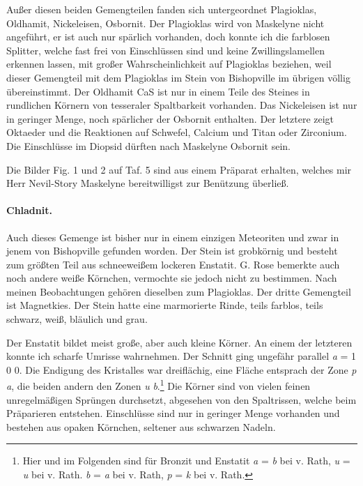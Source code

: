 \documentclass[a4paper, 12pt, oneside]{article}
\begin{document}
Außer diesen beiden Gemengteilen fanden sich untergeordnet Plagioklas, Oldhamit, Nickeleisen, Osbornit. Der Plagioklas wird von Maskelyne nicht angeführt, er ist auch nur spärlich vorhanden, doch konnte ich die farblosen Splitter, welche fast frei von Einschlüssen sind und keine Zwillingslamellen erkennen lassen, mit großer Wahrscheinlichkeit auf Plagioklas beziehen, weil dieser Gemengteil mit dem Plagioklas im Stein von Bishopville im übrigen völlig übereinstimmt. Der Oldhamit CaS ist nur in einem Teile des Steines in rundlichen Körnern von tesseraler Spaltbarkeit vorhanden. Das Nickeleisen ist nur in geringer Menge, noch spärlicher der Osbornit enthalten. Der letztere zeigt Oktaeder und die Reaktionen auf Schwefel, Calcium und Titan oder Zirconium. Die Einschlüsse im Diopsid dürften nach Maskelyne Osbornit sein.

Die Bilder Fig. 1 und 2 auf Taf. 5 sind aus einem Präparat erhalten, welches mir Herr Nevil-Story Maskelyne bereitwilligst zur Benützung überließ.

\paragraph{Chladnit.} Auch dieses Gemenge ist bisher nur in einem einzigen Meteoriten und zwar in jenem von Bishopville gefunden worden. Der Stein ist grobkörnig und besteht zum größten Teil aus schneeweißem lockeren Enstatit. G. Rose bemerkte auch noch andere weiße Körnchen, vermochte sie jedoch nicht zu bestimmen. Nach meinen Beobachtungen gehören dieselben zum Plagioklas. Der dritte Gemengteil ist Magnetkies. Der Stein hatte eine marmorierte Rinde, teils farblos, teils schwarz, weiß, bläulich und grau.

Der Enstatit bildet meist große, aber auch kleine Körner. An einem der letzteren konnte ich scharfe Umrisse wahrnehmen. Der Schnitt ging ungefähr parallel \emph{a} = 1 0 0. Die Endigung des Kristalles war dreiflächig, eine Fläche entsprach der Zone \emph{p} \emph{a},  die beiden andern den Zonen \emph{u} \emph{b}.\footnote{Hier und im Folgenden sind für Bronzit und Enstatit \emph{a} = \emph{b} bei v. Rath, \emph{u} = \emph{u} bei v. Rath. \emph{b} = \emph{a} bei v. Rath, \emph{p} = \emph{k} bei v. Rath.} Die Körner sind von vielen feinen unregelmäßigen Sprüngen durchsetzt, abgesehen von den Spaltrissen, welche beim Präparieren entstehen. Einschlüsse sind nur in geringer Menge vorhanden und bestehen aus opaken Körnchen, seltener aus schwarzen Nadeln.
\end{document}
